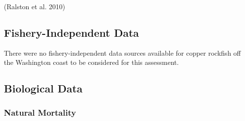 \documentclass[11pt,
  english,
  a4paper,
]{article}
\begin{document}
\leavevmode\tagmcend\tagstructend


{(Ralston et al. 2010)\leavevmode\tagmcend\tagstructend}

\leavevmode\tagmcend\tagstructend\par


\hypertarget{fishery-independent-data}{%
\subsection{Fishery-Independent Data}\label{fishery-independent-data}}

\leavevmode\tagmcend\tagstructend


There were no fishery-independent data sources available for copper rockfish off the Washington coast to be considered for this assessment.

\leavevmode\tagmcend\tagstructend\par


\hypertarget{biological-data}{%
\subsection{Biological Data}\label{biological-data}}

\leavevmode\tagmcend\tagstructend


\hypertarget{natural-mortality}{%
\subsubsection{Natural Mortality}\label{natural-mortality}}

\leavevmode\tagmcend\tagstructend

\end{document}
